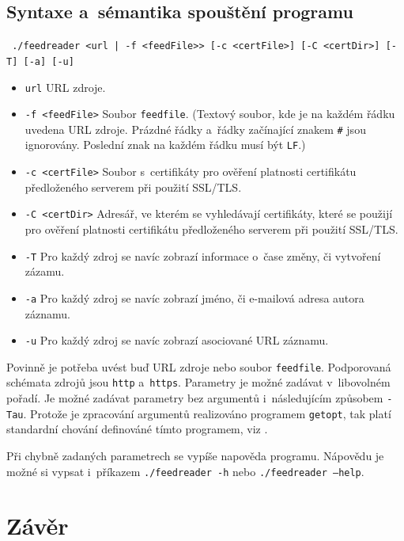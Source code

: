 \documentclass[a4paper, 11pt]{article}
\begin{document}
	\subsection{Syntaxe a~sémantika spouštění programu}

	\texttt{
		./feedreader <url | -f <feedFile>> [-c <certFile>] [-C <certDir>]
			[-T] [-a] [-u]
	}
	\begin{itemize}
		\item \texttt{url} URL zdroje.
		\item \texttt{-f <feedFile>} Soubor \texttt{feedfile}. (Textový soubor,
			kde je na každém řádku uvedena URL zdroje. Prázdné řádky a~řádky
			začínající znakem \texttt{\#} jsou ignorovány. Poslední znak na
			každém řádku musí být \texttt{LF}.)
		\item \texttt{-c <certFile>} Soubor s~certifikáty pro ověření
			platnosti certifikátu předloženého serverem při použití SSL/TLS.
		\item \texttt{-C <certDir>} Adresář, ve kterém se vyhledávají
			certifikáty, které se použijí pro ověření platnosti certifikátu
			předloženého serverem při použití SSL/TLS.
		\item \texttt{-T} Pro každý zdroj se navíc zobrazí informace o~čase
			změny, či vytvoření zázamu.
		\item \texttt{-a} Pro každý zdroj se navíc zobrazí jméno, či e-mailová
			adresa autora záznamu.
		\item \texttt{-u} Pro každý zdroj se navíc zobrazí asociované URL
			záznamu.
	\end{itemize}
	Povinně je potřeba uvést buď URL zdroje nebo soubor \texttt{feedfile}.
	Podporovaná schémata zdrojů jsou \texttt{http} a~\texttt{https}.
	Parametry je možné zadávat v~libovolném pořadí. Je možné zadávat parametry
	bez argumentů i~následujícím způsobem \texttt{-Tau}. Protože je
	zpracování argumentů realizováno programem \texttt{getopt}, tak platí
	standardní chování definováné tímto programem, viz \cite{getopt}.

	Při chybně zadaných parametrech se vypíše napověda programu. Nápovědu
	je možné si vypsat i~příkazem \texttt{./feedreader -h} nebo
	\texttt{./feedreader --help}.



	\section{Závěr}
\end{document}
